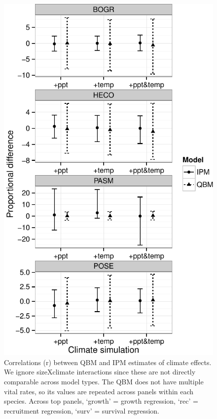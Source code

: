 \documentclass[12pt,]{article}
\begin{document}
\begin{figure}[htbp]
\centering
\includegraphics{components/figure/manuscript-figure_6.pdf}
\caption{Correlations (r) between QBM and IPM estimates of climate
effects. We ignore sizeXclimate interactions since these are not
directly comparable across model types. The QBM does not have multiple
vital rates, so its values are repeated across panels within each
species. Across top panels, `growth' = growth regression, `rec' =
recruitment regression, `surv' = survival regression.}
\end{figure}

\pagebreak{}
\end{document}

